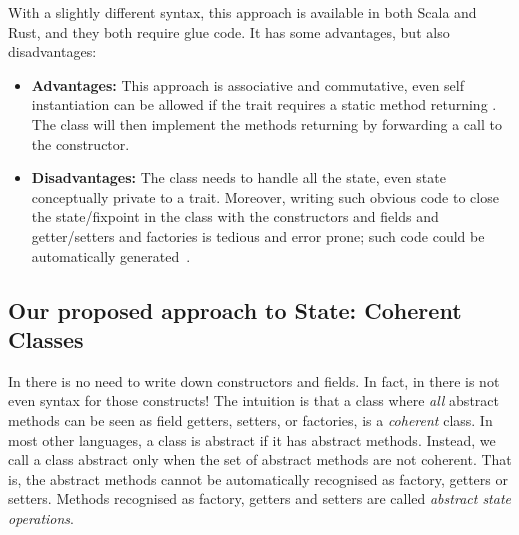 \noindent 

With a slightly different syntax, this approach is available in both Scala and Rust, and they both require glue code.
It has some advantages, but also disadvantages: 

\begin{itemize}

\item {\bf Advantages:} This approach is associative and commutative, even self instantiation
  can be allowed if the trait requires a static method
  returning \Q@This@. The class will then implement the methods returning \Q@This@
  by forwarding a call to the constructor.
  
\item {\bf Disadvantages:}
The class needs to handle all the state, even state conceptually
   private to a trait. 
 Moreover, writing such obvious code to close
  the state/fixpoint in the class 
   with the constructors and fields and getter/setters and factories is tedious and error prone; such code could be automatically
   generated~\cite{wang2016classless}.
\end{itemize}

\subsection{Our proposed approach to State: Coherent Classes}

In \name there is no need to write down constructors and fields. In fact, in
\name there is not even syntax for those constructs!  The intuition is that
a class where \emph{all} abstract methods can be seen as field getters, setters, or factories,
is a \emph{coherent} class.  In most other languages, a class is
abstract if it has abstract methods.  Instead, we call a class
abstract only when the set of abstract methods are not coherent. That
is, the abstract methods cannot be automatically recognised
as factory, getters or setters. Methods recognised as factory, getters and setters are called
\emph{abstract state operations}.
  
